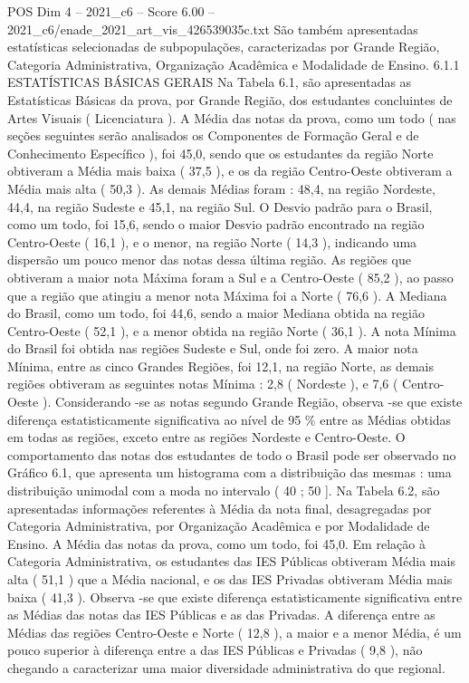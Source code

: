 \begin{textsample}{POS Dim 4 – 2021\_c6 – Score 6.00 – 2021\_c6/enade\_2021\_art\_vis\_426539035c.txt}
São também apresentadas estatísticas selecionadas de subpopulações, caracterizadas por Grande Região, Categoria Administrativa, Organização Acadêmica e Modalidade de Ensino. 6.1.1 ESTATÍSTICAS BÁSICAS GERAIS Na Tabela 6.1, são apresentadas as Estatísticas Básicas da prova, por Grande Região, dos estudantes concluintes de Artes Visuais ( Licenciatura ).
A Média das notas da prova, como um todo ( nas seções seguintes serão analisados os Componentes de Formação Geral e de Conhecimento Específico ), foi 45,0, sendo que os estudantes da região Norte obtiveram a Média mais baixa ( 37,5 ), e os da região Centro-Oeste obtiveram a Média mais alta ( 50,3 ).
As demais Médias foram : 48,4, na região Nordeste, 44,4, na região Sudeste e 45,1, na região Sul.
O Desvio padrão para o Brasil, como um todo, foi 15,6, sendo o maior Desvio padrão encontrado na região Centro-Oeste ( 16,1 ), e o menor, na região Norte ( 14,3 ), indicando uma dispersão um pouco menor das notas dessa última região.
As regiões que obtiveram a maior nota Máxima foram a Sul e a Centro-Oeste ( 85,2 ), ao passo que a região que atingiu a menor nota Máxima foi a Norte ( 76,6 ).
A Mediana do Brasil, como um todo, foi 44,6, sendo a maior Mediana obtida na região Centro-Oeste ( 52,1 ), e a menor obtida na região Norte ( 36,1 ).
A nota Mínima do Brasil foi obtida nas regiões Sudeste e Sul, onde foi zero.
A maior nota Mínima, entre as cinco Grandes Regiões, foi 12,1, na região Norte, as demais regiões obtiveram as seguintes notas Mínima : 2,8 ( Nordeste ), e 7,6 ( Centro-Oeste ).
Considerando -se as notas segundo Grande Região, observa -se que existe diferença estatisticamente significativa ao nível de 95 \% entre as Médias obtidas em todas as regiões, exceto entre as regiões Nordeste e Centro-Oeste.
O comportamento das notas dos estudantes de todo o Brasil pode ser observado no Gráfico 6.1, que apresenta um histograma com a distribuição das mesmas : uma distribuição unimodal com a moda no intervalo ( 40 ; 50 ].
Na Tabela 6.2, são apresentadas informações referentes à Média da nota final, desagregadas por Categoria Administrativa, por Organização Acadêmica e por Modalidade de Ensino.
A Média das notas da prova, como um todo, foi 45,0.
Em relação à Categoria Administrativa, os estudantes das IES Públicas obtiveram Média mais alta ( 51,1 ) que a Média nacional, e os das IES Privadas obtiveram Média mais baixa ( 41,3 ).
Observa -se que existe diferença estatisticamente significativa entre as Médias das notas das IES Públicas e as das Privadas.
A diferença entre as Médias das regiões Centro-Oeste e Norte ( 12,8 ), a maior e a menor Média, é um pouco superior à diferença entre a das IES Públicas e Privadas ( 9,8 ), não chegando a caracterizar uma maior diversidade administrativa do que regional.

\end{textsample}
